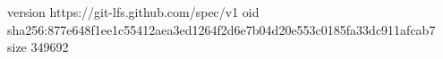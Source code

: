 version https://git-lfs.github.com/spec/v1
oid sha256:877e648f1ee1c55412aea3ed1264f2d6e7b04d20e553c0185fa33dc911afcab7
size 349692
